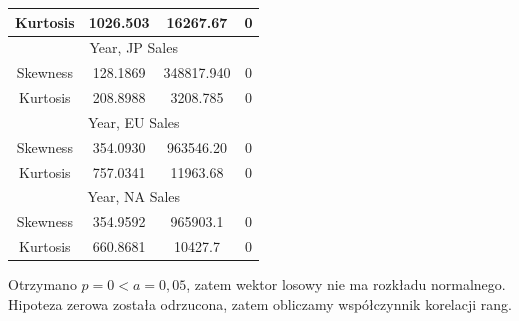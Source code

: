 \documentclass[12pt]{article}
\begin{document}
\begin{table}[H]
\begin{tabular}{|cccc|}
			\multicolumn{1}{|c|}{\cellcolor[HTML]{FFFFFF}Kurtosis} & \multicolumn{1}{c|}{\cellcolor[HTML]{FFFFFF}1026.503} & \multicolumn{1}{c|}{\cellcolor[HTML]{FFFFFF}16267.67}   & 0                             \\ \hline

\multicolumn{4}{|c|}{Year, JP Sales}                                                                                                                                                                       \\ \hline

			\multicolumn{1}{|c|}{\cellcolor[HTML]{FFFFFF}Skewness} & \multicolumn{1}{c|}{\cellcolor[HTML]{FFFFFF}128.1869} & \multicolumn{1}{c|}{\cellcolor[HTML]{FFFFFF}348817.940} & 0                             \\ \hline

			\multicolumn{1}{|c|}{\cellcolor[HTML]{FFFFFF}Kurtosis} & \multicolumn{1}{c|}{\cellcolor[HTML]{FFFFFF}208.8988} & \multicolumn{1}{c|}{\cellcolor[HTML]{FFFFFF}3208.785}   & 0                             \\ \hline

\multicolumn{4}{|c|}{Year, EU Sales}                                                                                                                                                                       \\ \hline

			\multicolumn{1}{|c|}{\cellcolor[HTML]{FFFFFF}Skewness} & \multicolumn{1}{c|}{\cellcolor[HTML]{FFFFFF}354.0930} & \multicolumn{1}{c|}{\cellcolor[HTML]{FFFFFF}963546.20} & 0                             \\ \hline

			\multicolumn{1}{|c|}{\cellcolor[HTML]{FFFFFF}Kurtosis} & \multicolumn{1}{c|}{\cellcolor[HTML]{FFFFFF}757.0341} & \multicolumn{1}{c|}{\cellcolor[HTML]{FFFFFF}11963.68}   & 0                             \\ \hline

\multicolumn{4}{|c|}{Year, NA Sales}                                                                                                                                                                       \\ \hline

			\multicolumn{1}{|c|}{\cellcolor[HTML]{FFFFFF}Skewness} & \multicolumn{1}{c|}{\cellcolor[HTML]{FFFFFF}354.9592} & \multicolumn{1}{c|}{\cellcolor[HTML]{FFFFFF}965903.1} & 0                             \\ \hline

			\multicolumn{1}{|c|}{\cellcolor[HTML]{FFFFFF}Kurtosis} & \multicolumn{1}{c|}{\cellcolor[HTML]{FFFFFF}660.8681} & \multicolumn{1}{c|}{\cellcolor[HTML]{FFFFFF}10427.7}   & 0                             \\ \hline

		\end{tabular}
	\end{table}
	Otrzymano \(p=0<a=0,05\), zatem wektor losowy nie ma rozkładu normalnego. Hipoteza zerowa została odrzucona, zatem obliczamy współczynnik korelacji rang.
	
\end{document}

